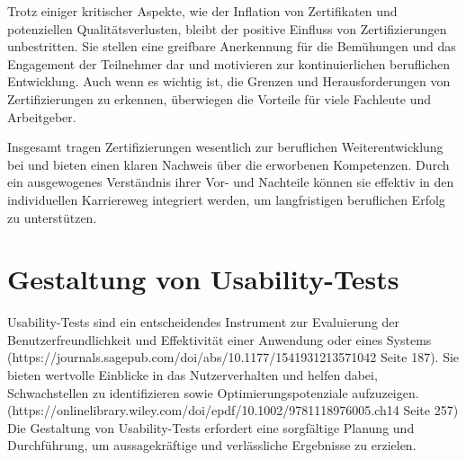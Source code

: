 Trotz einiger kritischer Aspekte, wie der Inflation von Zertifikaten und potenziellen Qualitätsverlusten, bleibt der positive Einfluss von Zertifizierungen unbestritten. Sie stellen eine greifbare Anerkennung für die Bemühungen und das Engagement der Teilnehmer dar und motivieren zur kontinuierlichen beruflichen Entwicklung. Auch wenn es wichtig ist, die Grenzen und Herausforderungen von Zertifizierungen zu erkennen, überwiegen die Vorteile für viele Fachleute und Arbeitgeber. 

Insgesamt tragen Zertifizierungen wesentlich zur beruflichen Weiterentwicklung bei und bieten einen klaren Nachweis über die erworbenen Kompetenzen. Durch ein ausgewogenes Verständnis ihrer Vor- und Nachteile können sie effektiv in den individuellen Karriereweg integriert werden, um langfristigen beruflichen Erfolg zu unterstützen.

\section{Gestaltung von Usability-Tests}
Usability-Tests sind ein entscheidendes Instrument zur Evaluierung der Benutzerfreundlichkeit und Effektivität einer Anwendung oder eines Systems (https://journals.sagepub.com/doi/abs/10.1177/1541931213571042 Seite 187). 
Sie bieten wertvolle Einblicke in das Nutzerverhalten und helfen dabei, Schwachstellen zu identifizieren sowie Optimierungspotenziale aufzuzeigen.(https://onlinelibrary.wiley.com/doi/epdf/10.1002/9781118976005.ch14 Seite 257) 
Die Gestaltung von Usability-Tests erfordert eine sorgfältige Planung und Durchführung, um aussagekräftige und verlässliche Ergebnisse zu erzielen.


